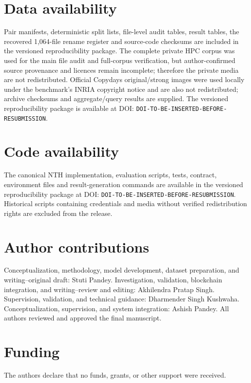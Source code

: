 \documentclass[12pt]{article}
\newcommand{\RepositoryDOI}{DOI-TO-BE-INSERTED-BEFORE-RESUBMISSION}
\begin{document}
\color{black}
\section*{Data availability}
\color{revisionred}

Pair manifests, deterministic split lists, file-level audit tables, result tables, the recovered 1,064-file rename register and source-code checksums are included in the versioned reproducibility package. The complete private HPC corpus was used for the main file audit and full-corpus verification, but author-confirmed source provenance and licences remain incomplete; therefore the private media are not redistributed. Official Copydays original/strong images were used locally under the benchmark's INRIA copyright notice and are also not redistributed; archive checksums and aggregate/query results are supplied. The versioned reproducibility package is available at DOI: \texttt{\RepositoryDOI}.

\section*{Code availability}

The canonical NTH implementation, evaluation scripts, tests, contract, environment files and result-generation commands are available in the versioned reproducibility package at DOI: \texttt{\RepositoryDOI}. Historical scripts containing credentials and media without verified redistribution rights are excluded from the release.

\color{black}
\section*{Author contributions}

Conceptualization, methodology, model development, dataset preparation, and writing--original draft: Stuti Pandey. Investigation, validation, blockchain integration, and writing--review and editing: Akhilendra Pratap Singh. Supervision, validation, and technical guidance: Dharmender Singh Kushwaha. Conceptualization, supervision, and system integration: Ashish Pandey. All authors reviewed and approved the final manuscript.

\section*{Funding}

The authors declare that no funds, grants, or other support were received.
\end{document}
